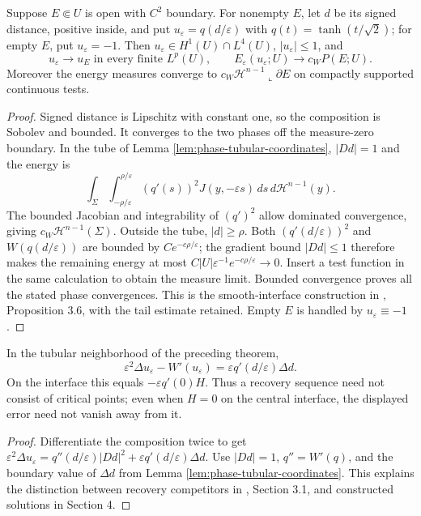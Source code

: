 \begin{theorem}\label{thm:phase-smooth-recovery}
Suppose $E\Subset U$ is open with $C^2$ boundary. For nonempty $E$, let $d$ be its signed distance, positive inside, and put $u_\varepsilon=q(d/\varepsilon)$ with $q(t)=\tanh(t/\sqrt2)$; for empty $E$, put $u_\varepsilon=-1$. Then $u_\varepsilon\in H^1(U)\cap L^4(U)$, $|u_\varepsilon|\leq1$, and
\[
 u_\varepsilon\to u_E\text{ in every finite }L^p(U),\qquad
 E_\varepsilon(u_\varepsilon;U)\to c_WP(E;U).
\]
Moreover the energy measures converge to $c_W\mathcal H^{n-1}\llcorner\partial E$ on compactly supported continuous tests.
\end{theorem}
\begin{proof}
Signed distance is Lipschitz with constant one, so the composition is Sobolev and bounded. It converges to the two phases off the measure-zero boundary. In the tube of Lemma \ref{lem:phase-tubular-coordinates}, $|Dd|=1$ and the energy is
\[
 \int_\Sigma\int_{-\rho/\varepsilon}^{\rho/\varepsilon}
 (q'(s))^2J(y,-\varepsilon s)\,ds\,d\mathcal H^{n-1}(y).
\]
The bounded Jacobian and integrability of $(q')^2$ allow dominated convergence, giving $c_W\mathcal H^{n-1}(\Sigma)$. Outside the tube, $|d|\geq\rho$. Both $(q'(d/\varepsilon))^2$ and $W(q(d/\varepsilon))$ are bounded by $Ce^{-c\rho/\varepsilon}$; the gradient bound $|Dd|\leq1$ therefore makes the remaining energy at most $C|U|\varepsilon^{-1}e^{-c\rho/\varepsilon}\to0$. Insert a test function in the same calculation to obtain the measure limit. Bounded convergence proves all the stated phase convergences. This is the smooth-interface construction in \cite{ChAC}, Proposition 3.6, with the tail estimate retained. Empty $E$ is handled by $u_\varepsilon\equiv-1$.
\end{proof}

\begin{proposition}\label{prop:phase-recovery-residual}
In the tubular neighborhood of the preceding theorem,
\[
 \varepsilon^2\Delta u_\varepsilon-W'(u_\varepsilon)
 =\varepsilon q'(d/\varepsilon)\Delta d.
\]
On the interface this equals $-\varepsilon q'(0)H$. Thus a recovery sequence need not consist of critical points; even when $H=0$ on the central interface, the displayed error need not vanish away from it.
\end{proposition}
\begin{proof}
Differentiate the composition twice to get
$\varepsilon^2\Delta u_\varepsilon=q''(d/\varepsilon)|Dd|^2+\varepsilon q'(d/\varepsilon)\Delta d$. Use $|Dd|=1$, $q''=W'(q)$, and the boundary value of $\Delta d$ from Lemma \ref{lem:phase-tubular-coordinates}. This explains the distinction between recovery competitors in \cite{ChAC}, Section 3.1, and constructed solutions in Section 4.
\end{proof}

